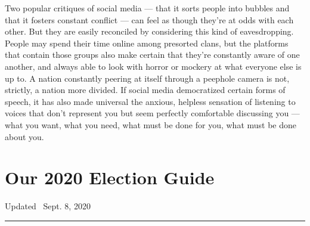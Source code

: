 Two popular critiques of social media --- that it sorts people into
bubbles and that it fosters constant conflict --- can feel as though
they're at odds with each other. But they are easily reconciled by
considering this kind of eavesdropping. People may spend their time
online among presorted clans, but the platforms that contain those
groups also make certain that they're constantly aware of one another,
and always able to look with horror or mockery at what everyone else is
up to. A nation constantly peering at itself through a peephole camera
is not, strictly, a nation more divided. If social media democratized
certain forms of speech, it has also made universal the anxious,
helpless sensation of listening to voices that don't represent you but
seem perfectly comfortable discussing you --- what you want, what you
need, what must be done for you, what must be done about you.

\hypertarget{our-2020-election-guide}{%
\section{Our 2020 Election Guide}\label{our-2020-election-guide}}

Updated ~Sept. 8, 2020

\begin{center}\rule{0.5\linewidth}{\linethickness}\end{center}

